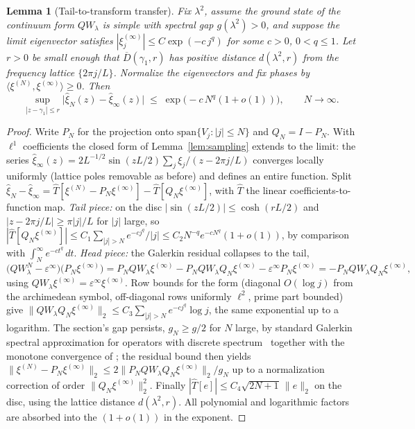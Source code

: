 \documentclass[11pt,a4paper]{article}
\newtheorem{lemma}{Lemma}
\begin{document}
\begin{lemma}[Tail-to-transform transfer]\label{lem:tail}
Fix $\lambda^2$, assume the ground state of the continuum form $QW_\lambda$ is
simple with spectral gap $g(\lambda^2)>0$, and suppose the limit eigenvector
satisfies $|\xi^{(\infty)}_j|\le C\exp(-c\,j^{q})$ for some $c>0$,
$0<q\le1$. Let $r>0$ be small enough that
$\overline{D}(\gamma_1,r)$ has positive distance $d(\lambda^2,r)$ from the
frequency lattice $\{2\pi j/L\}$. Normalize the eigenvectors and fix phases by
$\langle\xi^{(N)},\xi^{(\infty)}\rangle\ge0$. Then
\[
  \sup_{|z-\gamma_1|\le r}\bigl|\widehat\xi_N(z)-\widehat\xi_\infty(z)\bigr|
  \;\le\;\exp\!\bigl(-c\,N^{q}(1+o(1))\bigr),\qquad N\to\infty .
\]
\end{lemma}
\begin{proof}
Write $P_N$ for the projection onto $\mathrm{span}\{V_j:|j|\le N\}$ and
$Q_N=I-P_N$. With $\ell^1$ coefficients the closed form of
Lemma~\ref{lem:sampling} extends to the limit: the series
$\widehat\xi_\infty(z)=2L^{-1/2}\sin(zL/2)\sum_j\xi_j/(z-2\pi j/L)$ converges
locally uniformly (lattice poles removable as before) and defines an entire
function. Split
$\widehat\xi_N-\widehat\xi_\infty=\widehat{T}[\xi^{(N)}-P_N\xi^{(\infty)}]
-\widehat{T}[Q_N\xi^{(\infty)}]$, with $\widehat T$ the linear
coefficients-to-function map. \emph{Tail piece:} on the disc
$|\sin(zL/2)|\le\cosh(rL/2)$ and $|z-2\pi j/L|\ge\pi|j|/L$ for $|j|$ large,
so $|\widehat T[Q_N\xi^{(\infty)}]|\le
C_1\sum_{|j|>N}e^{-cj^{q}}/|j|\le C_2N^{-q}e^{-cN^{q}}(1+o(1))$, by comparison
with $\int_N^\infty e^{-ct^{q}}\,dt$. \emph{Head piece:} the Galerkin residual
collapses to the tail,
\[
  \bigl(QW^N_\lambda-\varepsilon^\infty\bigr)\bigl(P_N\xi^{(\infty)}\bigr)
  =P_NQW_\lambda\xi^{(\infty)}-P_NQW_\lambda Q_N\xi^{(\infty)}
   -\varepsilon^\infty P_N\xi^{(\infty)}
  =-P_NQW_\lambda Q_N\xi^{(\infty)},
\]
using $QW_\lambda\xi^{(\infty)}=\varepsilon^\infty\xi^{(\infty)}$. Row bounds
for the form (diagonal $O(\log j)$ from the archimedean symbol, off-diagonal
rows uniformly $\ell^2$, prime part bounded) give
$\|QW_\lambda Q_N\xi^{(\infty)}\|_2\le
C_3\sum_{|j|>N}e^{-cj^{q}}\log j$, the same exponential up to a logarithm.
The section's gap persists, $g_N\ge g/2$ for $N$ large, by standard Galerkin
spectral approximation for operators with discrete
spectrum~\cite{BabuskaOsborn1991} together with the monotone convergence of
\cite[Prop.~3.4]{CCM2025}; the residual bound then yields
$\|\xi^{(N)}-P_N\xi^{(\infty)}\|_2\le 2\|P_NQW_\lambda
Q_N\xi^{(\infty)}\|_2/g_N$ up to a normalization correction of order
$\|Q_N\xi^{(\infty)}\|_2^2$. Finally
$|\widehat T[e]|\le C_4\sqrt{2N{+}1}\,\|e\|_2$ on the disc, using the lattice
distance $d(\lambda^2,r)$. All polynomial and logarithmic factors are absorbed
into the $(1+o(1))$ in the exponent.
\end{proof}
\end{document}
